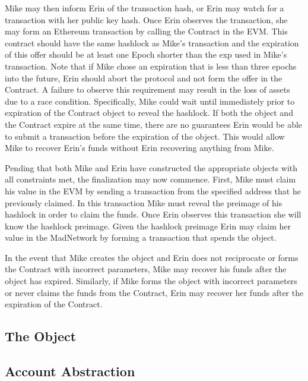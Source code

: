 Mike may then inform Erin of the transaction hash, or Erin may watch
for a transaction with her public key hash.
Once Erin observes the transaction, she may form an Ethereum
transaction by calling the \AtomicSwap{}Contract in the EVM.
This contract should have the same hashlock as Mike's transaction and
the expiration of this offer should be at least one Epoch shorter than
the exp used in Mike's transaction.
Note that if Mike chose an expiration that is less than three epochs
into the future, Erin should abort the protocol and not form the offer
in the \AtomicSwap{}Contract.
A failure to observe this requirement may result in the loss of assets
due to a race condition.
Specifically, Mike could wait until immediately prior to expiration of
the \AtomicSwap{}Contract object to reveal the hashlock.
If both the \AtomicSwap{} object and the \AtomicSwap{}Contract expire at the
same time, there are no guarantees Erin would be able to submit a
transaction before the expiration of the \AtomicSwap{} object.
This would allow Mike to recover Erin's funds without Erin recovering
anything from Mike.

Pending that both Mike and Erin have constructed the appropriate
objects with all constraints met, the finalization may now commence.
First, Mike must claim his value in the EVM by sending a transaction
from the specified address that he previously claimed.
In this transaction Mike must reveal the preimage of his hashlock in
order to claim the funds.
Once Erin observes this transaction she will know the hashlock preimage.
Given the hashlock preimage Erin may claim her value in the MadNetwork
by forming a transaction that spends the \AtomicSwap{} object.

In the event that Mike creates the \AtomicSwap{} object and Erin does not
reciprocate or forms the \AtomicSwap{}Contract with incorrect parameters,
Mike may recover his funds after the \AtomicSwap{} object has expired.
Similarly, if Mike forms the \AtomicSwap{} object with incorrect
parameters or never claims the funds from the \AtomicSwap{}Contract, Erin
may recover her funds after the expiration of the \AtomicSwap{}Contract.


\subsection{The \TxFee{} Object}


\subsection{Account Abstraction}

